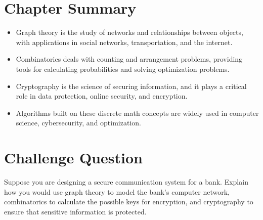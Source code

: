 \section{Chapter Summary}
\begin{itemize}
    \item Graph theory is the study of networks and relationships between objects, with applications in social networks, transportation, and the internet.
    \item Combinatorics deals with counting and arrangement problems, providing tools for calculating probabilities and solving optimization problems.
    \item Cryptography is the science of securing information, and it plays a critical role in data protection, online security, and encryption.
    \item Algorithms built on these discrete math concepts are widely used in computer science, cybersecurity, and optimization.
\end{itemize}

\section*{Challenge Question}
Suppose you are designing a secure communication system for a bank. Explain how you would use graph theory to model the bank’s computer network, combinatorics to calculate the possible keys for encryption, and cryptography to ensure that sensitive information is protected.